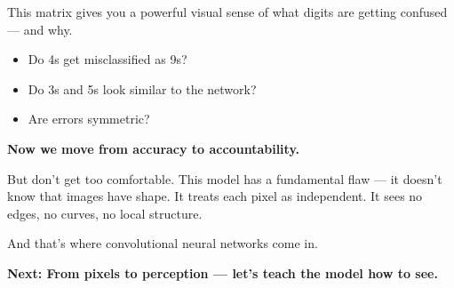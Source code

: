 \documentclass[11pt]{article}
\begin{document}
This matrix gives you a powerful visual sense of what digits are getting confused — and why.

\begin{itemize}
  \item Do 4s get misclassified as 9s?
  \item Do 3s and 5s look similar to the network?
  \item Are errors symmetric?
\end{itemize}

\textbf{Now we move from accuracy to accountability.}


But don’t get too comfortable.  
This model has a fundamental flaw — it doesn’t know that images have shape. It treats each pixel as independent. It sees no edges, no curves, no local structure.

And that’s where convolutional neural networks come in.

\bigskip

\begin{center}
\textbf{Next: From pixels to perception — let’s teach the model how to see.}
\end{center}
\end{document}
